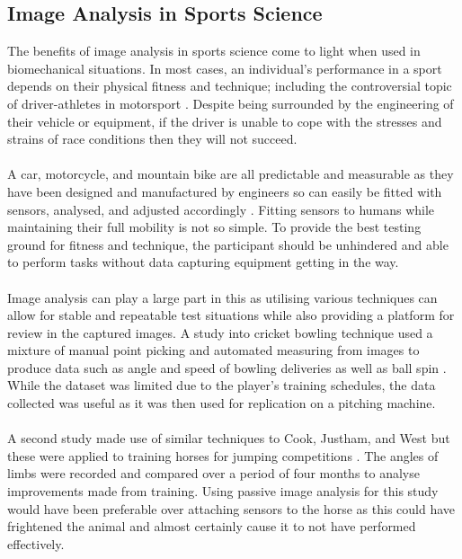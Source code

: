 \subsection{Image Analysis in Sports Science}
	The benefits of image analysis in sports science come to light when used in biomechanical situations. In most cases, an individual's performance in a sport depends on their physical fitness and technique; including the controversial topic of driver-athletes in motorsport . Despite being surrounded by the engineering of their vehicle or equipment, if the driver is unable to cope with the stresses and strains of race conditions then they will not succeed. 
	\\\\
	A car, motorcycle, and mountain bike are all predictable and measurable as they have been designed and manufactured by engineers so can easily be fitted with sensors, analysed, and adjusted accordingly . Fitting sensors to humans while maintaining their full mobility is not so simple. To provide the best testing ground for fitness and technique, the participant should be unhindered and able to perform tasks without data capturing equipment getting in the way.
	\\\\
	Image analysis can play a large part in this as utilising various techniques can allow for stable and repeatable test situations while also providing a platform for review in the captured images. A study into cricket bowling technique used a mixture of manual point picking and automated measuring from images to produce data such as angle and speed of bowling deliveries as well as ball spin \citep{cricketimaging}. While the dataset was limited due to the player's training schedules, the data collected was useful as it was then used for replication on a pitching machine.
	\\\\
	A second study made use of similar techniques to Cook, Justham, and West but these were applied to training horses for jumping competitions \citep{jumpyhorses}. The angles of limbs were recorded and compared over a period of four months to analyse improvements made from training. Using passive image analysis for this study would have been preferable over attaching sensors to the horse as this could have frightened the animal and almost certainly cause it to not have performed effectively.